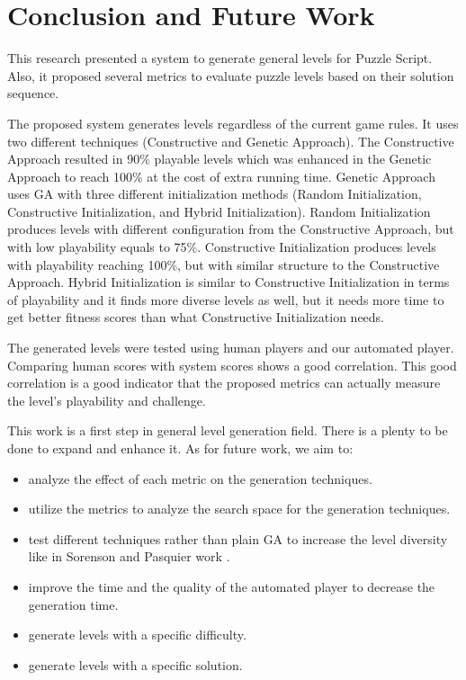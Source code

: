 \documentclass[letterpaper]{article}
\begin{document}
\section{Conclusion and Future Work}
This research presented a system to generate general levels for Puzzle Script. Also, it proposed several metrics to evaluate puzzle levels based on their solution sequence.\\\par

The proposed system generates levels regardless of the current game rules. It uses two different techniques (Constructive and Genetic Approach). The Constructive Approach resulted in 90\% playable levels which was enhanced in the Genetic Approach to reach 100\% at the cost of extra running time. Genetic Approach uses GA with three different initialization methods (Random Initialization, Constructive Initialization, and Hybrid Initialization). Random Initialization produces levels with different configuration from the Constructive Approach, but with low playability equals to 75\%. Constructive Initialization produces levels with playability reaching 100\%, but with similar structure to the Constructive Approach. Hybrid Initialization is similar to Constructive Initialization in terms of playability and it finds more diverse levels as well, but it needs more time to get better fitness scores than what Constructive Initialization needs.\\\par

The generated levels were tested using human players and our automated player. Comparing human scores with system scores shows a good correlation. This good correlation is a good indicator that the proposed metrics can actually measure the level's playability and challenge.\\\par

This work is a first step in general level generation field. There is a plenty to be done to expand and enhance it. As for future work, we aim to:
\begin{itemize}
	\item analyze the effect of each metric on the generation techniques.
	\item utilize the metrics to analyze the search space for the generation techniques.
	\item test different techniques rather than plain GA to increase the level diversity like in Sorenson and Pasquier work \cite{genericLevelFramework}.
	\item improve the time and the quality of the automated player to decrease the generation time.
	\item generate levels with a specific difficulty.
	\item generate levels with a specific solution.
\end{itemize}
\end{document}
